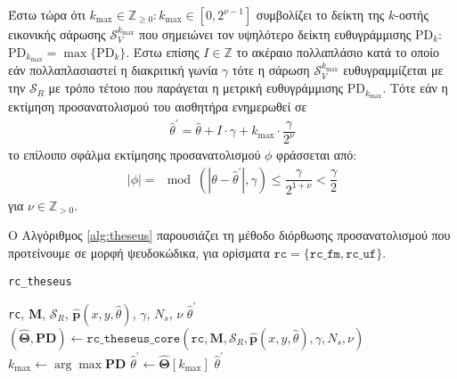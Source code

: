 Έστω τώρα ότι $k_{\max} \in \mathbb{Z}_{\geq 0} : k_{\max} \in [0,2^{\nu-1}]$
συμβολίζει το δείκτη της $k$-οστής εικονικής σάρωσης $\mathcal{S}_V^{k_{\max}}$
που σημειώνει τον υψηλότερο δείκτη ευθυγράμμισης PD$_k$:
$\text{PD}_{k_{\max}} = \max \{\text{PD}_k\}$. Έστω επίσης $I \in \mathbb{Z}$
το ακέραιο πολλαπλάσιο κατά το οποίο εάν πολλαπλασιαστεί η διακριτική γωνία
$\gamma$ τότε η σάρωση $\mathcal{S}_V^{k_{\max}}$ ευθυγραμμίζεται με την
$\mathcal{S}_R$ με τρόπο τέτοιο που παράγεται η μετρική ευθυγράμμισης
PD$_{k_{\max}}$. Τότε εάν η εκτίμηση προσανατολισμού του αισθητήρα ενημερωθεί
σε
\begin{align}
  \hat{\theta}^\prime = \hat{\theta} + I \cdot \gamma + k_{\max} \cdot \dfrac{\gamma}{2^\nu}
\end{align}
το επίλοιπο σφάλμα εκτίμησης προσανατολισμού $\phi$ φράσσεται από:
\begin{align}
  |\phi| = \mod(|\theta - \hat{\theta}^\prime|, \gamma) \leq \dfrac{\gamma}{2^{1+\nu}} < \dfrac{\gamma}{2}
\end{align}
για $\nu \in \mathbb{Z}_{>0}$.

Ο Αλγόριθμος \ref{alg:theseus} παρουσιάζει τη μέθοδο διόρθωσης προσανατολισμού
που προτείνουμε σε μορφή ψευδοκώδικα, για ορίσματα
$\texttt{rc} = \{\texttt{rc\_fm}, \texttt{rc\_uf}\}$.

\begin{algorithm}
  \caption{\texttt{rc\_theseus}}
  \begin{spacing}{1.5}
  \begin{algorithmic}[1]
    \REQUIRE \texttt{rc}, $\bm{M}$, $\mathcal{S}_R$, $\hat{\bm{p}}(x, y, \hat{\theta})$, $\gamma$, $N_s$, $\nu$
    \ENSURE $\hat{\theta}^\prime$
    \STATE $(\hat{\bm{\Theta}}, \textbf{PD}) \leftarrow \texttt{rc\_theseus\_core}(\texttt{rc}, \bm{M}, \mathcal{S}_R, \hat{\bm{p}}(x, y, \hat{\theta}), \gamma, N_s, \nu)$
    \STATE $k_{\max} \leftarrow \arg\max\textbf{PD}$
    \STATE $\hat{\theta}^\prime \leftarrow \hat{\bm{\Theta}}[k_{\max}]$
    \RETURN $\hat{\theta}^\prime$
  \end{algorithmic}
  \end{spacing}
  \label{alg:theseus}
\end{algorithm}

